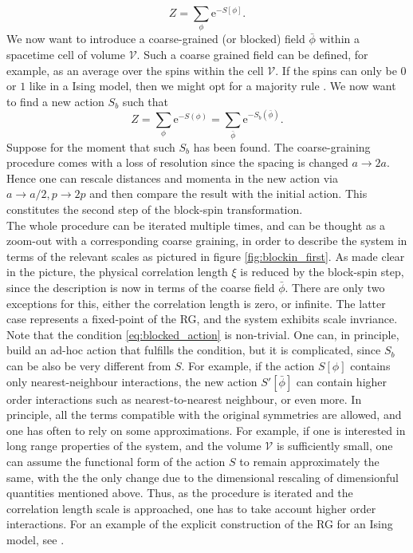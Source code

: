 \begin{equation*}
    Z=\sum_{\phi} \mathrm{e}^{-S[\phi]}.
\end{equation*}
We now want to introduce a coarse-grained (or blocked) field $\bar\phi$ within a spacetime cell of volume $\mathcal{V}$. Such a coarse grained field can be defined, for example, as an average over the spins within the cell $\mathcal{V}$. If the spins can only be $0$ or $1$ like in a Ising model, then we might opt for a majority rule \cite{cardy_1996}.
We now want to find a new action $S_b$ such that 
\begin{equation}
    Z=\sum_{\phi} \mathrm{e}^{-S(\phi)}= \sum_{\bar\phi} \mathrm{e}^{-S_b\left(\bar\phi\right)}.
    \label{eq:blocked_action}
\end{equation}
Suppose for the moment that such $S_b$ has been found. The coarse-graining procedure comes with a loss of resolution since the spacing is changed $a \to 2a$. Hence one can rescale distances and momenta in the new action via $a \to a/2, p \to 2p$ and then compare the result with the initial action. This constitutes the second step of the block-spin transformation. \\
The whole procedure can be iterated multiple times, and can be thought as a zoom-out with a corresponding coarse graining, in order to describe the system in terms of the relevant scales as pictured in figure \ref{fig:blockin_first}. As made clear in the picture, the physical correlation length $\xi$ is reduced by the block-spin step, since the description is now in terms of the coarse field $\bar\phi$. 
There are only two exceptions for this, either the correlation length is zero, or infinite. The latter case represents a fixed-point of the RG, and the system exhibits scale invriance. \\
Note that the condition \eqref{eq:blocked_action} is non-trivial. One can, in principle, build an ad-hoc action that fulfills the condition, but it is complicated, since $S_b$ can be also be very different from $S$. For example, if the action $S[\phi]$ contains only nearest-neighbour interactions, the new action $S'[\bar\phi]$ can contain higher order interactions such as nearest-to-nearest neighbour, or even more.  In principle, all the terms compatible with the original symmetries are allowed, and one has often to rely on some approximations. For example, if one is interested in long range properties of the system, and the volume $\mathcal{V}$ is sufficiently small, one can assume 
the functional form of the action $S$ to remain approximately the same, with the the only change due to the dimensional rescaling of dimensionful quantities mentioned above. Thus, as the procedure is iterated and the correlation length scale is approached, one has to take account higher order interactions. For an example of the explicit construction of the RG for an Ising model, see \cite{cardy_1996}.

